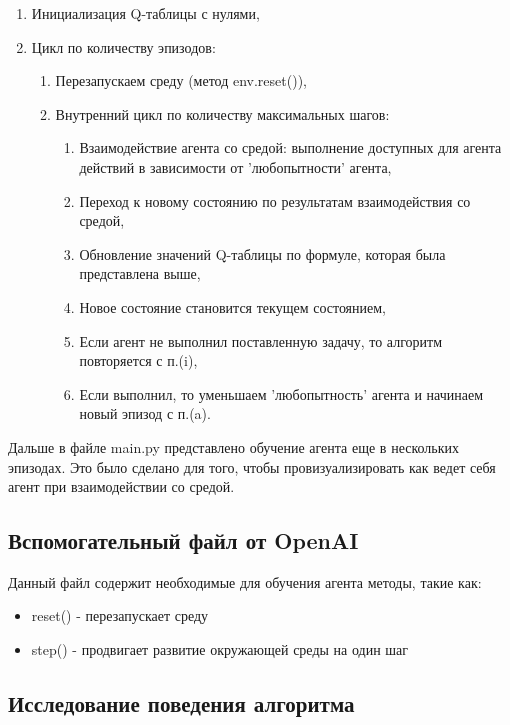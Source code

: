 \documentclass[a4paper]{report}
\theoremstyle{definition}
\theoremstyle{plain}
\theoremstyle{remark}
\theoremstyle{remark}
\theoremstyle{definition}
\begin{document}
\begin{enumerate}
    \item Инициализация Q-таблицы с нулями,
    \item Цикл по количеству эпизодов:
    \begin{enumerate}
        \item Перезапускаем среду (метод env.reset()),
        \item Внутренний цикл по количеству максимальных шагов:
        \begin{enumerate}
            \item Взаимодействие агента со средой: выполнение доступных для агента действий в зависимости от 'любопытности' агента,
            \item Переход к новому состоянию по результатам взаимодействия со средой,
            \item Обновление значений Q-таблицы по формуле, которая была представлена выше,
            \item Новое состояние становится текущем состоянием,
            \item Если агент не выполнил поставленную задачу, то алгоритм повторяется с п.(i),
            \item Если выполнил, то уменьшаем 'любопытность' агента и начинаем новый эпизод с п.(a).
        \end{enumerate}
    \end{enumerate}
\end{enumerate}

Дальше в файле main.py представлено обучение агента еще в нескольких эпизодах. Это было сделано для того, чтобы провизуализировать как ведет себя агент при взаимодействии со средой.
\begin{center}
    \subsection{Вспомогательный файл от OpenAI}
\end{center}
Данный файл содержит необходимые для обучения агента методы, такие как:
\begin{itemize}
    \item reset() - перезапускает среду
    \item step() - продвигает развитие окружающей среды на один шаг
\end{itemize}

\newpage
\begin{center}
\section{Исследование поведения алгоритма}
\end{center}
\end{document}
